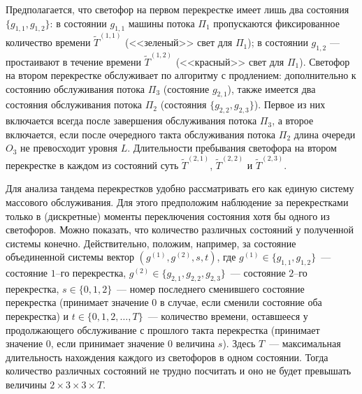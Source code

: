 \documentclass[11pt]{ubs}
\begin{document}
Предполагается, что светофор на первом перекрестке имеет лишь два состояния $\{g_{1,1},g_{1,2}\}$: в состоянии $g_{1,1}$ машины потока $\Pi_1$ пропускаются фиксированное количество времени $\widetilde T^{(1,1)}$ (<<зеленый>> свет для $\Pi_1$); в состоянии $g_{1,2}$ --- простаивают в течение времени $\widetilde T^{(1,2)}$ (<<красный>> свет для $\Pi_1$). Светофор на втором перекрестке обслуживает по алгоритму с продлением: дополнительно к состоянию обслуживания потока $\Pi_3$ (состояние $g_{2,1}$), также имеется два состояния обслуживания потока $\Pi_2$ (состояния $\{g_{2,2},g_{2,3}\}$). Первое из них включается всегда после завершения обслуживания потока $\Pi_3$, а второе включается, если после очередного такта обслуживания потока $\Pi_2$ длина очереди $O_3$ не превосходит уровня $L$.
Длительности пребывания светофора на втором перекрестке в каждом из состояний суть $\widetilde T^{(2,1)}$, $\widetilde T^{(2,2)}$ и $\widetilde T^{(2,3)}$.

Для анализа тандема перекрестков удобно рассматривать его как единую систему массового обслуживания. Для этого предположим наблюдение за перекрестками только в (дискретные) моменты переключения состояния хотя бы одного из светофоров. Можно показать, что количество различных состояний у полученной системы конечно. Действительно, положим, например, за состояние объединенной системы вектор $(g^{(1)},g^{(2)}, s, t)$, где $g^{(1)}\in \{g_{1,1},g_{1,2}\}$~--- состояние $1$--го перекрестка, $g^{(2)}\in \{g_{2,1},g_{2,2},g_{2,3}\}$~--- состояние $2$--го перекрестка, $s \in \{0, 1, 2\}$~--- номер последнего сменившего состояние перекрестка (принимает значение $0$ в случае, если сменили состояние оба перекрестка) и $t \in \{0, 1, 2, \ldots, T\}$~--- количество времени, оставшееся у продолжающего обслуживание с прошлого такта перекрестка (принимает значение $0$, если принимает значение $0$ величина $s$). Здесь $T$~--- максимальная длительность нахождения каждого из светофоров в одном состоянии. Тогда количество различных состояний не трудно посчитать и оно не будет превышать величины  $2\times 3 \times 3 \times T$.
\end{document}
